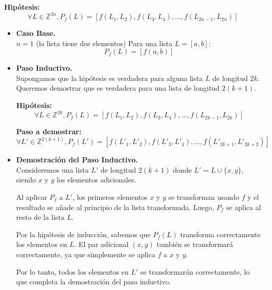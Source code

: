 \documentclass[12pt, a4paper]{article}
\begin{document}
\textbf{Hipótesis:}
\[
\forall L \in \mathbb{Z}^{2n}, P_f(L) = [f(L_1, L_2), f(L_3, L_4), \dots, f(L_{2n-1}, L_{2n})]
\]
\begin{itemize}
  \item \textbf{Caso Base.} \\ \( n = 1 \) (la lista tiene dos elementos)
  Para una lista \( L = [a, b] \):
  \[ P_f(L) = [f(a, b)] \]
  \item \textbf{Paso Inductivo.} \\ Supongamos que la hipótesis es verdadera para alguna lista \( L \) de longitud \( 2k \). Queremos demostrar que es verdadera para una lista de longitud \( 2(k + 1) \).

  \textbf{Hipótesis:}
  \[
  \forall L \in \mathbb{Z}^{2k}, P_f(L) = [f(L_1, L_2), f(L_3, L_4), \dots, f(L_{2k-1}, L_{2k})]
  \]
  
  \textbf{Paso a demostrar:}
  \[
  \forall L' \in \mathbb{Z}^{2(k+1)}, P_f(L') = [f(L'_1, L'_2), f(L'_3, L'_4), \dots, f(L'_{2k+1}, L'_{2k+2})]
  \]
  \item  \textbf{Demostración del Paso Inductivo.}\\

  Consideremos una lista \( L' \) de longitud \( 2(k + 1) \) donde \( L' = L \cup \{x, y\} \), siendo \( x \) y \( y \) los elementos adicionales.
  
  Al aplicar \( P_f \) a \( L' \), los primeros elementos \( x \) y \( y \) se transforman usando \( f \) y el resultado se añade al principio de la lista transformada. Luego, \( P_f \) se aplica al resto de la lista \( L \).
  
  Por la hipótesis de inducción, sabemos que \( P_f(L) \) transforma correctamente los elementos en \( L \). El par adicional \( (x, y) \) también se transformará correctamente, ya que simplemente se aplica \( f \) a \( x \) y \( y \).
  
  Por lo tanto, todos los elementos en \( L' \) se transformarán correctamente, lo que completa la demostración del paso inductivo.
   
\end{itemize}
\end{document}
